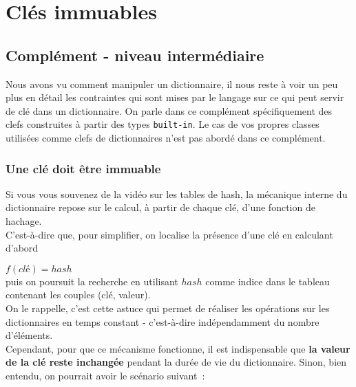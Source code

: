     \hypertarget{cluxe9s-immuables}{%
\section{Clés immuables}\label{cluxe9s-immuables}}

    \hypertarget{compluxe9ment---niveau-intermuxe9diaire}{%
\subsection{Complément - niveau
intermédiaire}\label{compluxe9ment---niveau-intermuxe9diaire}}

    Nous avons vu comment manipuler un dictionnaire, il nous reste à voir un
peu plus en détail les contraintes qui sont mises par le langage sur ce
qui peut servir de clé dans un dictionnaire. On parle dans ce complément
spécifiquement des clefs construites à partir des types
\texttt{built-in}. Le cas de vos propres classes utilisées comme clefs
de dictionnaires n'est pas abordé dans ce complément.

    \hypertarget{une-cluxe9-doit-uxeatre-immuable}{%
\subsubsection{Une clé doit être
immuable}\label{une-cluxe9-doit-uxeatre-immuable}}

    Si vous vous souvenez de la vidéo sur les tables de hash, la mécanique
interne du dictionnaire repose sur le calcul, à partir de chaque clé,
d'une fonction de hachage.\\

C'est-à-dire que, pour simplifier, on localise la présence d'une clé en
calculant d'abord

\(f(clé) = hash\)\\

puis on poursuit la recherche en utilisant \(hash\) comme indice dans le
tableau contenant les couples (clé, valeur).\\

On le rappelle, c'est cette astuce qui permet de réaliser les opérations
sur les dictionnaires en temps constant - c'est-à-dire indépendamment du
nombre d'éléments.\\

    Cependant, pour que ce mécanisme fonctionne, il est indispensable que
\textbf{la valeur de la clé reste inchangée} pendant la durée de vie du
dictionnaire. Sinon, bien entendu, on pourrait avoir le scénario
suivant~:

